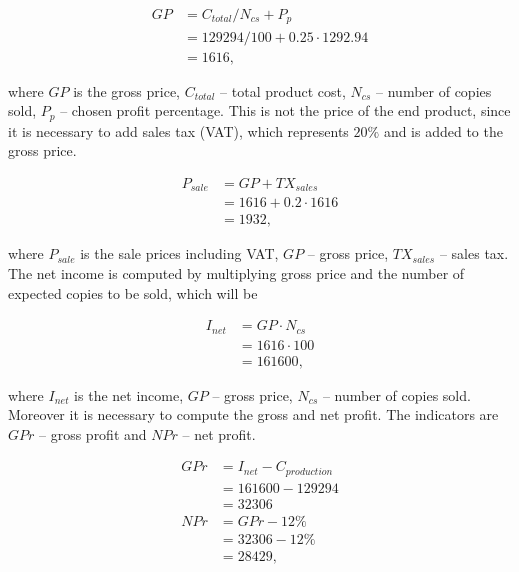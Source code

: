 \begin{equation}
 \begin{split}
  GP &= C_{total} / N_{cs} + P_{p}\\
              &= 129294/100 + 0.25 \cdot 1292.94\\
              &= 1616,
 \end{split}
\end{equation}

\noindent
where $GP$ is the gross price, $C_{total}$ -- total product cost, $N_{cs}$ -- number of copies sold, $P_{p}$ -- chosen profit percentage. This is not the price of the end product, since it is necessary to add sales tax (VAT), which represents $20\%$ and is added to the gross price. 

\begin{equation}
 \begin{split}
  P_{sale} &= GP + TX_{sales}\\
              &= 1616 + 0.2 \cdot 1616 \\
              &= 1932,
 \end{split}
\end{equation}

\noindent
where $P_{sale}$ is the sale prices including VAT, $GP$ -- gross price, $TX_{sales}$ -- sales tax. The net income is computed by multiplying gross price and the number of expected copies to be sold, which will be

\begin{equation}
 \begin{split}
  I_{net} &= GP \cdot N_{cs}\\
              &= 1616  \cdot 100 \\
              &= 161600,
 \end{split}
\end{equation}

\noindent
where $I_{net}$ is the net income, $GP$ -- gross price, $N_{cs}$ -- number of copies sold. Moreover it is necessary to compute the gross and net profit. The indicators are $GPr$ -- gross profit and $NPr$ -- net profit.

\begin{equation}
 \begin{split}
  GPr &= I_{net} - C_{production}\\
              &= 161600 - 129294\\
              &= 32306\\
  NPr &= GPr - 12\% \\
             &= 32306 - 12\% \\
             &= 28429,
 \end{split}
\end{equation}

